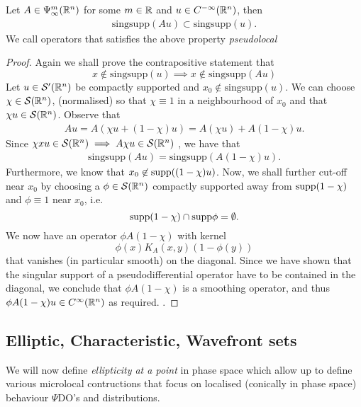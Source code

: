 \documentclass[12pt]{article}
\begin{document}
\begin{fprop}
    Let $A \in \Psi^m_\infty({\mathbb R}^n)$ for some $m \in {\ensuremath {\mathbb R}}$ and $u \in C^{-\infty}({\mathbb R}^n)$, then 
    \begin{align*}
        \mathrm{sing supp}(A u) \subset \mathrm{sing supp }(u). 
    \end{align*}
    We call operators that satisfies the above property \textit{pseudolocal}
\end{fprop}
\begin{proof}
    Again we shall prove the contrapositive statement that 
    \[
    x \not \in \mathrm{sing supp}(u) \implies x \not \in \mathrm{sing supp}(Au)
    \]
    Let $u \in \mathcal{S}'({\mathbb R}^n)$ be compactly supported and $x_0 \not \in \mathrm{sing supp}(u)$.  We can choose $\chi \in \mathcal{S}({\mathbb R}^n)$, (normalised) so that $\chi \equiv 1$ in a neighbourhood of $x_0$ and that $\chi u \in \mathcal{S}({\mathbb R}^n)$. Observe that 
    \begin{align*}
        Au = A(\chi u + (1 - \chi)u) = A(\chi u) + A(1 - \chi)u. 
    \end{align*}
    Since $\chi xu \in \mathcal{S}({\mathbb R}^n) \implies A\chi u \in \mathcal{S}({\mathbb R}^n)$ \cite{rbm lemma 2.3}, we have that 
    \begin{align*}
        \mathrm{singsupp}(Au) = \mathrm{singsupp}(A(1 - \chi)u). 
    \end{align*}
    Furthermore, we know that $x_0 \not \in \mathrm{supp}((1 - \chi)u)$. 
    Now, we shall further cut-off near $x_0$ by choosing a $\phi \in \mathcal{S}({\mathbb R}^n)$ compactly supported  away from $\mathrm{supp}(1 - \chi)$ and $\phi \equiv 1$ near $x_0$, i.e. 
    \[
    \mathrm{supp}(1 - \chi) \cap \mathrm{supp} \phi = \emptyset. 
    \]
    We now have an operator $\phi A(1 - \chi) $ with kernel
    \[
    \phi(x) K_A(x, y) ( 1 - \phi(y))
    \]
    that vanishes (in particular smooth) on the diagonal. Since we have shown that the singular support of a pseudodifferential operator have to be contained in the diagonal, we conclude that $\phi A(1 - \chi)$ is a smoothing operator, and thus $\phi A (1 - \chi) u \in C^\infty({\mathbb R}^n)$ as required. .  
\end{proof}


\subsection{Elliptic, Characteristic, Wavefront sets}
We will now define \textit{ellipticity at a point} in phase space which allow up to define various microlocal contructions that focus on  localised (conically in phase space) behaviour $\Psi$DO's and distributions. 
\end{document}
